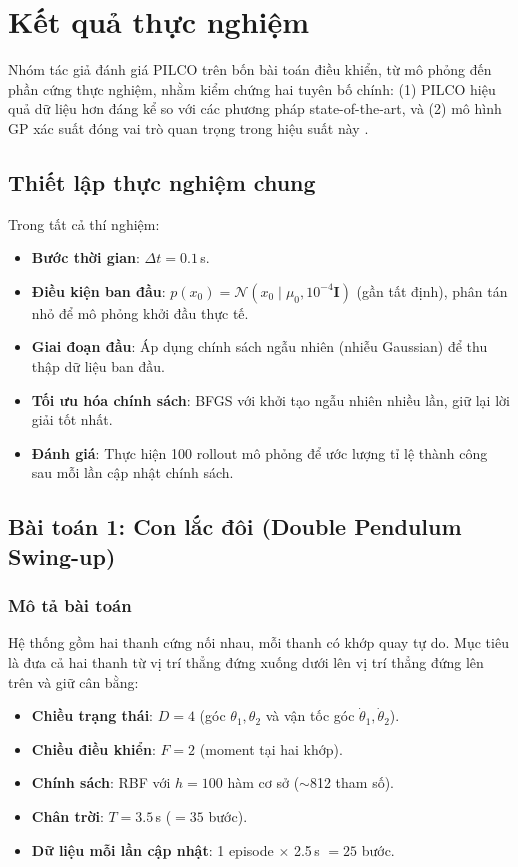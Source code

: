 \section{Kết quả thực nghiệm}
\label{SEC_experiments}

Nhóm tác giả đánh giá PILCO trên bốn bài toán điều khiển, từ mô phỏng đến phần cứng thực nghiệm, nhằm kiểm chứng hai tuyên bố chính: (1) PILCO hiệu quả dữ liệu hơn đáng kể so với các phương pháp state-of-the-art, và (2) mô hình GP xác suất đóng vai trò quan trọng trong hiệu suất này \cite{Deisenroth_2015}.

\subsection{Thiết lập thực nghiệm chung}
\label{SUB_SEC_experiment_setup}

Trong tất cả thí nghiệm:
\begin{itemize}
    \item \textbf{Bước thời gian}: $\Delta t = 0.1$\,s.
    \item \textbf{Điều kiện ban đầu}: $p(x_0) = \mathcal{N}(x_0 \mid \mu_0, 10^{-4} \mathbf{I})$ (gần tất định), phân tán nhỏ để mô phỏng khởi đầu thực tế.
    \item \textbf{Giai đoạn đầu}: Áp dụng chính sách ngẫu nhiên (nhiễu Gaussian) để thu thập dữ liệu ban đầu.
    \item \textbf{Tối ưu hóa chính sách}: BFGS với khởi tạo ngẫu nhiên nhiều lần, giữ lại lời giải tốt nhất.
    \item \textbf{Đánh giá}: Thực hiện 100 rollout mô phỏng để ước lượng tỉ lệ thành công sau mỗi lần cập nhật chính sách.
\end{itemize}

\subsection{Bài toán 1: Con lắc đôi (Double Pendulum Swing-up)}
\label{SUB_SEC_double_pendulum}

\subsubsection{Mô tả bài toán}
\label{SUB_SUB_SEC_dp_description}

Hệ thống gồm hai thanh cứng nối nhau, mỗi thanh có khớp quay tự do. Mục tiêu là đưa cả hai thanh từ vị trí thẳng đứng xuống dưới lên vị trí thẳng đứng lên trên và giữ cân bằng:
\begin{itemize}
    \item \textbf{Chiều trạng thái}: $D = 4$ (góc $\theta_1, \theta_2$ và vận tốc góc $\dot{\theta}_1, \dot{\theta}_2$).
    \item \textbf{Chiều điều khiển}: $F = 2$ (moment tại hai khớp).
    \item \textbf{Chính sách}: RBF với $h = 100$ hàm cơ sở ($\sim$812 tham số).
    \item \textbf{Chân trời}: $T = 3.5$\,s ($= 35$ bước).
    \item \textbf{Dữ liệu mỗi lần cập nhật}: 1 episode $\times$ 2.5\,s $= 25$ bước.
\end{itemize}

